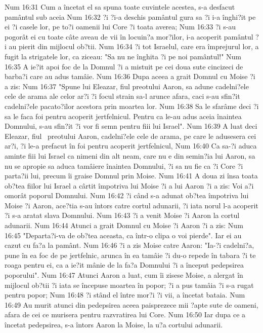 Num 16:31  Cum a încetat el sa spuna toate cuvintele acestea, s-a desfacut pamântul sub aceia
Num 16:32  ?i ?i-a deschis pamântul gura sa ?i i-a înghi?it pe ei ?i casele lor, pe to?i oamenii lui Core ?i toata averea;
Num 16:33  ?i s-au pogorât ei cu toate câte aveau de vii în locuin?a mor?ilor, i-a acoperit pamântul ?i au pierit din mijlocul ob?tii.
Num 16:34  ?i tot Israelul, care era împrejurul lor, a fugit la strigatele lor, ca ziceau: "Sa nu ne înghita ?i pe noi pamântul!"
Num 16:35  A ie?it apoi foc de la Domnul ?i a mistuit pe cei doua sute cincizeci de barba?i care au adus tamâie.
Num 16:36  Dupa aceea a grait Domnul cu Moise ?i a zis:
Num 16:37  "Spune lui Eleazar, fiul preotului Aaron, sa adune cadelni?ele cele de arama ale celor ar?i ?i focul strain sa-l arunce afara, caci s-au sfin?it cadelni?ele pacato?ilor acestora prin moartea lor.
Num 16:38  Sa le sfarâme deci ?i sa le faca foi pentru acoperit jertfelnicul. Pentru ca le-au adus aceia înaintea Domnului, s-au sfin?it ?i vor fi semn pentru fiii lui Israel".
Num 16:39  A luat deci Eleazar, fiul  preotului Aaron, cadelni?ele cele de arama, pe care le adusesera cei ar?i, ?i le-a prefacut în foi pentru acoperit jertfelnicul,
Num 16:40  Ca sa-?i aduca aminte fiii lui Israel ca nimeni din alt neam, care nu e din semin?ia lui Aaron, sa nu se apropie sa aduca tamâiere înaintea Domnului, ?i sa nu fie ca ?i Core ?i parta?ii lui, precum îi graise Domnul prin Moise.
Num 16:41  A doua zi însa toata ob?tea fiilor lui Israel a cârtit împotriva lui Moise ?i a lui Aaron ?i a zis: Voi a?i omorât poporul Domnului.
Num 16:42  ?i când s-a adunat ob?tea împotriva lui Moise ?i Aaron, ace?tia s-au întors catre cortul adunarii, ?i iata norul l-a acoperit ?i s-a aratat slava Domnului.
Num 16:43  ?i a venit Moise ?i Aaron la cortul adunarii.
Num 16:44  Atunci a grait Domnul cu Moise ?i Aaron ?i a zis:
Num 16:45  "Departa?i-va de ob?tea aceasta, ca într-o clipa o voi pierde". Iar ei au cazut cu fa?a la pamânt.
Num 16:46  ?i a zis Moise catre Aaron: "Ia-?i cadelni?a, pune în ea foc de pe jertfelnic, arunca în ea tamâie ?i du-o repede în tabara ?i te roaga pentru ei, ca a ie?it mânie de la fa?a Domnului ?i a început pedepsirea poporului".
Num 16:47  Atunci Aaron a luat, cum îi zisese Moise, a alergat în mijlocul ob?tii ?i iata se începuse moartea în popor; ?i a pus tamâia ?i s-a rugat pentru popor;
Num 16:48  ?i stând el între mor?i ?i vii, a încetat bataia.
Num 16:49  Au murit atunci din pedepsirea aceea paisprezece mii ?apte sute de oameni, afara de cei ce murisera pentru razvratirea lui Core.
Num 16:50  Iar dupa ce a încetat pedepsirea, s-a întors Aaron la Moise, la u?a cortului adunarii.
